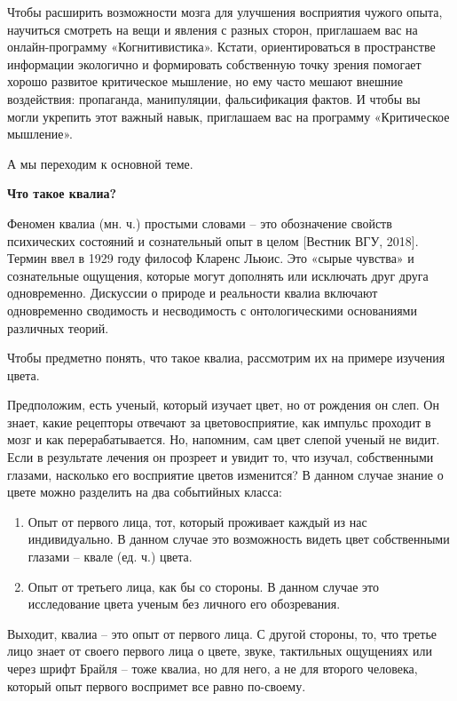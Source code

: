 Чтобы расширить возможности мозга для улучшения восприятия чужого опыта, научиться смотреть на вещи и явления с разных сторон, приглашаем вас на онлайн-программу «Когнитивистика». Кстати, ориентироваться в пространстве информации экологично и формировать собственную точку зрения помогает хорошо развитое критическое мышление, но ему часто мешают внешние воздействия: пропаганда, манипуляции, фальсификация фактов. И чтобы вы могли укрепить этот важный навык, приглашаем вас на программу «Критическое мышление».

А мы переходим к основной теме.

\textbf{Что такое квалиа?}

Феномен квалиа (мн. ч.) простыми словами – это обозначение свойств психических состояний и сознательный опыт в целом [Вестник ВГУ, 2018]. Термин ввел в 1929 году философ Кларенс Льюис. Это «сырые чувства» и сознательные ощущения, которые могут дополнять или исключать друг друга одновременно. Дискуссии о природе и реальности квалиа включают одновременно сводимость и несводимость с онтологическими основаниями различных теорий.

Чтобы предметно понять, что такое квалиа, рассмотрим их на примере изучения цвета.

Предположим, есть ученый, который изучает цвет, но от рождения он слеп. Он знает, какие рецепторы отвечают за цветовосприятие, как импульс проходит в мозг и как перерабатывается. Но, напомним, сам цвет слепой ученый не видит. Если в результате лечения он прозреет и увидит то, что изучал, собственными глазами, насколько его восприятие цветов изменится? В данном случае знание о цвете можно разделить на два событийных класса:


\begin{enumerate}
    \item
          Опыт от первого лица, тот, который проживает каждый из нас индивидуально. В данном случае это возможность видеть цвет собственными глазами – квале (ед. ч.) цвета.
    \item Опыт от третьего лица, как бы со стороны. В данном случае это исследование цвета ученым без личного его обозревания.
\end{enumerate}

Выходит, квалиа – это опыт от первого лица. С другой стороны, то, что третье лицо знает от своего первого лица о цвете, звуке, тактильных ощущениях или через шрифт Брайля – тоже квалиа, но для него, а не для второго человека, который опыт первого воспримет все равно по-своему.

